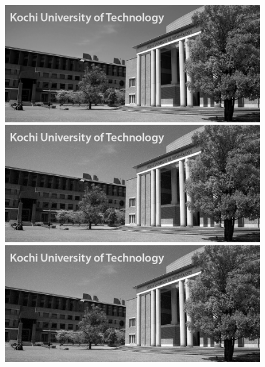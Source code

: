 \section{\result}
\begin{figure}[h]
    \centering
    \begin{minipage}[b]{.3\textwidth}
        \centering
        \includegraphics[keepaspectratio,width=\textwidth]{../../Figures/05_21_gimg.png}
    \end{minipage}
    \begin{minipage}[b]{.3\textwidth}
        \centering
        \includegraphics[keepaspectratio,width=\textwidth]{../../06_ImageFiltering/file_white-Gaussian-Noise.png}
    \end{minipage}
    \begin{minipage}[b]{.3\textwidth}
        \centering
        \includegraphics[keepaspectratio,width=\textwidth]{../../06_ImageFiltering/file_impluse-noise.png}

\end{minipage}
\end{figure}
